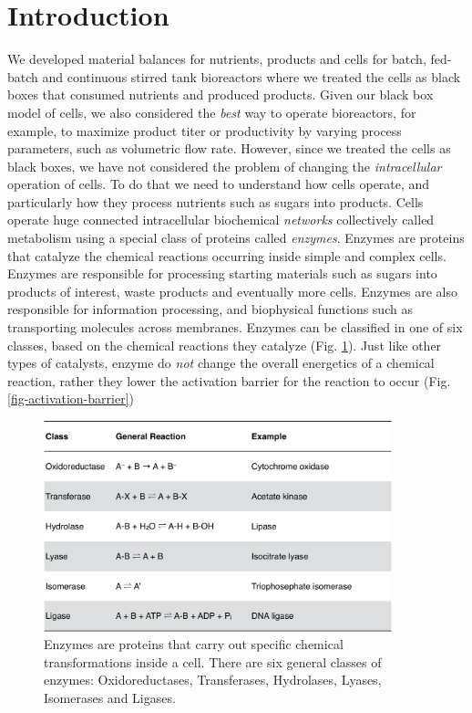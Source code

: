\documentclass[11pt]{article}
\theoremstyle{definition}
\begin{document}
\section*{Introduction}
We developed material balances for nutrients, products and cells for batch, fed-batch and continuous stirred tank bioreactors where
we treated the cells as black boxes that consumed nutrients and produced products. Given our black box model of cells,
we also considered the \textit{best} way to operate bioreactors, for example, to maximize product titer or productivity
by varying process parameters, such as volumetric flow rate. However, since we treated the cells as black boxes,
we have not considered the problem of changing the \textit{intracellular} operation of cells.
To do that we need to understand how cells operate, and particularly how they process nutrients such as sugars into products.
Cells operate huge connected intracellular biochemical \textit{networks} collectively called metabolism using a special class of proteins called \textit{enzymes}.
Enzymes are proteins that catalyze the chemical reactions occurring inside simple and complex cells.
Enzymes are responsible for processing starting materials such as sugars into products of interest, waste products and eventually more cells.
Enzymes are also responsible for information processing, and biophysical functions such as transporting molecules across membranes.
Enzymes can be classified in one of six classes, based on the chemical reactions they catalyze (Fig. \ref{fig-enzyme-table}).
Just like other types of catalysts, enzyme do \textit{not} change the overall energetics of a chemical reaction, rather they lower the activation
barrier for the reaction to occur (Fig. \ref{fig-activation-barrier})

\begin{figure}[!h]\centering
\includegraphics[width=0.9\textwidth]{./figs/Fig-EnzymeTable_v2.pdf}
\caption{Enzymes are proteins that carry out specific chemical transformations inside a cell.
There are six general classes of enzymes: Oxidoreductases, Transferases, Hydrolases, Lyases, Isomerases and Ligases.}\label{fig-enzyme-table}
\end{figure}
\end{document}
